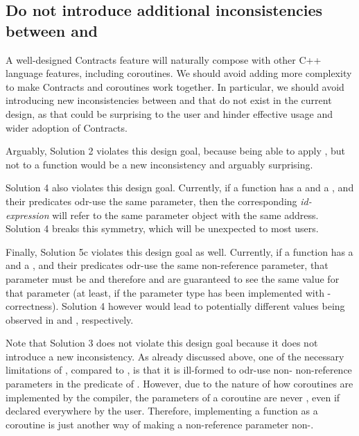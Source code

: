 \subsection{Do not introduce additional inconsistencies between  and }

A well-designed Contracts feature will naturally compose with other C++ language features, including coroutines. We should avoid adding more complexity to make Contracts and coroutines work together. In particular, we should avoid introducing new inconsistencies between  and  that do not exist in the current design, as that could be surprising to the user and hinder effective usage and wider adoption of Contracts.

Arguably, Solution 2 violates this design goal, because being able to apply , but not  to a function would be a new inconsistency and arguably surprising.

Solution 4 also violates this design goal. Currently, if a function has a  and a , and their predicates odr-use the same parameter, then the corresponding \emph{id-expression} will refer to the same parameter object with the same address. Solution 4 breaks this symmetry, which will be unexpected to most users.

Finally, Solution 5c violates this design goal as well. Currently, if a function has a  and a , and their predicates odr-use the same non-reference parameter, that parameter must be  and therefore  and  are guaranteed to see the same value for that parameter (at least, if the parameter type has been implemented with -correctness). Solution 4 however would lead to potentially different values being observed in  and , respectively.

Note that Solution 3 does not violate this design goal because it does not introduce a new inconsistency. As already discussed above, one of the necessary limitations of , compared to , is that it is ill-formed to odr-use non- non-reference parameters in the predicate of . However, due to the nature of how coroutines are implemented by the compiler, the parameters of a coroutine are never , even if declared  everywhere by the user. Therefore, implementing a function as a coroutine is just another way of making a non-reference parameter non-.

